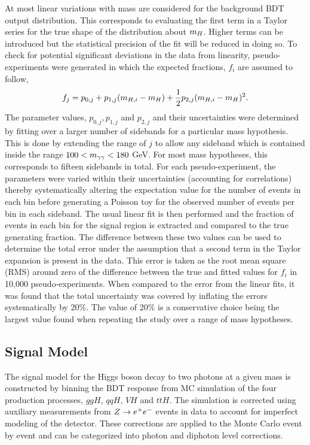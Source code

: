 At most linear variations with mass are considered for the background BDT output distribution.
This corresponds to evaluating the first term in a Taylor series for the true shape of the distribution
about $m_{H}$. Higher terms can be introduced but the statistical precision of the fit will be reduced in 
doing so. To check for potential significant deviations in the data from linearity, pseudo-experiments
were generated in which the expected fractions, $f_{i}$ are assumed to follow,
\begin{equation}
f_{j} = p_{0,j} + p_{1,j}(m_{H,i} - m_{H}) + \frac{\displaystyle 1}{\displaystyle 2} p_{2,j}(m_{H,i}-m_{H})^{2}.
\label{eqn:sbfitdefho}
\end{equation}
The parameter values, $p_{0,j},p_{1,j}$ and $p_{2,j}$ and their uncertainties were determined 
by fitting over a larger
number of sidebands for a particular mass hypothesis. This is done by extending the range of $j$ to allow
any sideband which is contained inside the range $100 < m_{\gamma\gamma} < 180$ GeV. For most mass hypotheses, this 
corresponds to fifteen sidebands in total. For each pseudo-experiment, the parameters were varied 
within their uncertainties (accounting for correlations) thereby systematically altering the expectation
value for the number of events in each bin before generating a Poisson toy for the observed number of 
events per bin in each sideband. The usual linear fit is then performed and the fraction of events in each
bin for the signal region is extracted and compared to the true generating fraction. The difference between these
two values can be used to determine the total error under the assumption
that a second term in the Taylor expansion is present in the data. This error is taken as the root mean square 
(RMS) around zero
of the difference between the true and fitted values for $f_{i}$ in 10,000 pseudo-experiments. When compared
to the error from the linear fits, it was found that the total uncertainty was covered by inflating
the errors systematically by 20\%. The value of 20\% is a conservative choice being the largest value 
found when repeating the study over a range of mass hypotheses. 

\subsection{Signal Model}
\label{sec:signalmodel}

The signal model for the Higgs boson decay to two photons at a given mass is constructed by 
binning the BDT response from MC simulation of the four production processes, $ggH$, $qqH$, $VH$ and $ttH$.
The simulation is corrected using auxiliary
measurements from $Z\rightarrow e^{+}e^{-}$ events in data to account for imperfect modeling of the detector.
These corrections are applied to the Monte Carlo event by event and can be categorized into
photon and diphoton level corrections.

